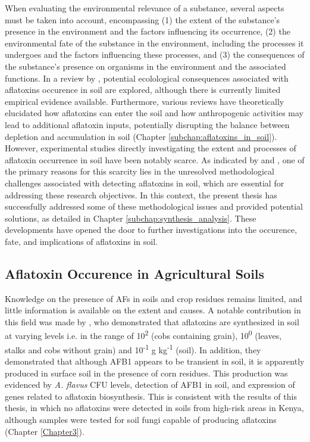 When evaluating the environmental relevance of a substance, several aspects must be taken into account, encompassing (1) the extent of the substance's presence in the environment and the factors influencing its occurrence, (2) the environmental fate of the substance in the environment, including the processes it undergoes and the factors influencing these processes, and (3) the consequences of the substance's presence on organisms in the environment and the associated functions. In a review by \citet{fouche2020aflatoxins}, potential ecolological consequences associated with aflatoxins occurence in soil are explored, although there is currently limited empirical evidence available. Furthermore, various reviews \citep{fouche2020aflatoxins, elmholt2008mycotoxins, juraschek2022mycotoxins} have theoretically elucidated how aflatoxins can enter the soil and how anthropogenic activities may lead to additional aflatoxin inputs, potentially disrupting the balance between depletion and accumulation in soil (Chapter \ref{subchap:aflatoxins_in_soil}). However, experimental studies directly investigating the extent and processes of aflatoxin occurrence in soil have been notably scarce. As indicated by \citet{elmholt2008mycotoxins} and \citet{abbas2009ecology}, one of the  primary reasons for this scarcity lies in the unresolved methodological challenges associated with detecting aflatoxins in soil, which are essential for addressing these research objectives. In this context, the present thesis has successfully addressed some of these methodological issues and provided potential solutions, as detailed in Chapter \ref{subchap:synthesis_analysis}. These developments have opened the door to further investigations into the occurence, fate, and implications of aflatoxins in soil.

\subsection{Aflatoxin Occurence in Agricultural Soils}

Knowledge on the presence of AFs in soils and crop residues remains limited, and little information is available on the extent and causes. A notable contribution in this field was made by \citet{accinelli2008aspergillus}, who demonstrated that aflatoxins are synthesized in soil at varying levels i.e. in the range of 10\textsuperscript{2} (cobs containing grain), 10\textsuperscript{0} (leaves, stalks and cobs without grain) and 10\textsuperscript{-1} \textmu g kg\textsuperscript{-1} (soil). In addition, they demonstrated that although AFB1 appears to be transient in soil, it is apparently produced in surface soil in the presence of corn residues. This production was evidenced by \textit{A. flavus} CFU levels, detection of AFB1 in soil, and expression of genes related to aflatoxin biosynthesis. This is consistent with the results of this thesis, in which no aflatoxins were detected in soils from high-risk areas in Kenya, although samples were tested for soil fungi capable of producing aflatoxins (Chapter \ref{Chapter3}).


